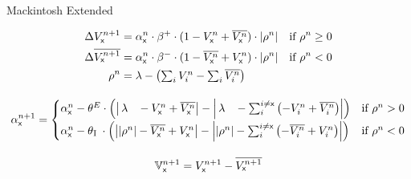 \documentclass[border=10pt,varwidth]{standalone}
\begin{document}
\newcommand{\eks}{\textsf{x}}
\newcommand{\longlambda}{\rlap{$\,\lambda$}\phantom{\left| \rho^n \right|}}
\newcommand{\longI}{\rlap{\textsubscript{I}}\phantom{\textsubscript{E}}}
\newcommand{\VNet}{\mathbb{V}}

\begin{center}
	\huge
	\sffamily
	Mackintosh Extended
\end{center}
\begin{gather*}
	\begin{aligned}
		\Delta V_\eks^{n + 1} &= \alpha_\eks^n \cdot \beta^+ \cdot (1 - V_\eks^n + \overline{V_\eks^n}) \cdot \left| \rho^n \right| & \text{if } \rho^n \geq 0 \\
		 \Delta \overline{V_\eks^{n + 1}} &= \alpha_\eks^n \cdot \beta^- \cdot (1 - \overline{V_\eks^n} + V_\eks^n) \cdot \left| \rho^n \right| & \text{if } \rho^n < 0\\
         \rho^n &= \lambda - \left( \textstyle\sum_i V_i^n - \textstyle\sum_i \overline{V_i^n} \right) 
	\end{aligned} \\[1em]
	\alpha_\eks^{n + 1} = \begin{cases}
		\alpha^n_\eks -\theta^E \cdot \left( \left| \longlambda - V_\eks^n + \overline{V_\eks^n} \right|- \left| \longlambda - \textstyle\sum_i^{i \neq \eks} \left( - V_i^n + \overline{V_i^n} \right) \right| \right) & \text{if } \rho^n > 0 \\[1ex]
		\alpha^n_\eks -\theta\longI{} \cdot \left( \left| \left| \rho^n \right| - \overline{V_\eks^n} + V_\eks^n \right| - \left| \left| \rho^n \right| - \textstyle\sum_i^{i \neq \eks} \left( - \overline{V_i^n} + V_i^n \right) \right| \right) & \text{if } \rho^n < 0
	\end{cases} \\[1em]
	\VNet{}_\eks^{n + 1} =  V_\eks^{n + 1} - \overline{V_\eks^{n + 1}}
\end{gather*}

\nocite{LePelley2004}

\end{document}
